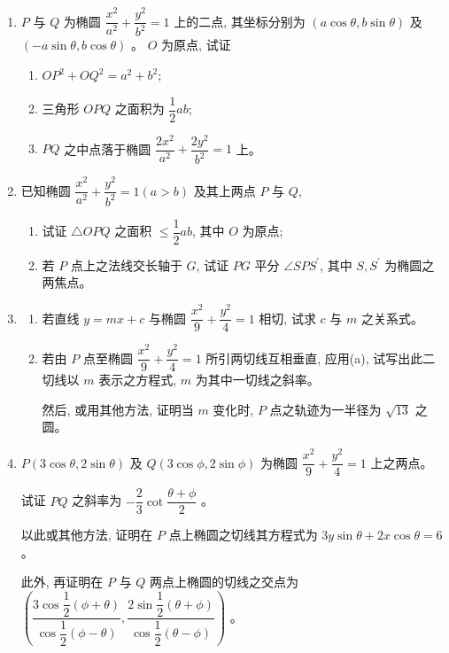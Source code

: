 \documentclass[10pt]{article}
\begin{document}
\begin{enumerate}
  \item $P$ 与 $Q$ 为椭圆 $\dfrac{x^{2}}{a^{2}}+\dfrac{y^{2}}{b^{2}}=1$ 上的二点, 其坐标分别为 $(a \cos \theta, b \sin \theta)$ 及 $(-a \sin \theta, b \cos \theta)$ 。 $O$ 为原点, 试证

  \begin{enumerate}
    \item $OP^{2}+OQ^{2}=a^{2}+b^{2}$;
    \item 三角形 $OPQ$ 之面积为 $\dfrac{1}{2} a b$;
    \item $PQ$ 之中点落于椭圆 $\dfrac{2 x^{2}}{a^{2}}+\dfrac{2 y^{2}}{b^{2}}=1$ 上。
  \end{enumerate}

  \item 已知椭圆 $\dfrac{x^{2}}{a^{2}}+\dfrac{y^{2}}{b^{2}}=1(a>b)$ 及其上两点 $P$ 与 $Q$,

  \begin{enumerate}
    \item 试证 $\triangle OPQ$ 之面积 $\leq \dfrac{1}{2} a b$, 其中 $O$ 为原点;
    \item 若 $P$ 点上之法线交长轴于 $G$, 试证 $PG$ 平分 $\angle SPS^{\prime}$, 其中 $S, S^{\prime}$ 为椭圆之两焦点。
  \end{enumerate}

  \item \begin{enumerate}
    \item 若直线 $y=m x+c$ 与椭圆 $\dfrac{x^{2}}{9}+\dfrac{y^{2}}{4}=1$ 相切, 试求 $c$ 与 $m$ 之关系式。
    \item 若由 $P$ 点至椭圆 $\dfrac{x^{2}}{9}+\dfrac{y^{2}}{4}=1$ 所引两切线互相垂直, 应用(a), 试写出此二切线以 $m$ 表示之方程式, $m$ 为其中一切线之斜率。
  
    然后, 或用其他方法, 证明当 $m$ 变化时, $P$ 点之轨迹为一半径为 $\sqrt{13}$ 之圆。
  \end{enumerate}

  \item $P(3 \cos \theta, 2 \sin \theta)$ 及 $Q(3 \cos \phi, 2 \sin \phi)$ 为椭圆 $\dfrac{x^{2}}{9}+\dfrac{y^{2}}{4}=1$ 上之两点。

  试证 $PQ$ 之斜率为 $-\dfrac{2}{3} \cot \dfrac{\theta+\phi}{2}$ 。

  以此或其他方法, 证明在 $P$ 点上椭圆之切线其方程式为 $3 y \sin \theta+2 x \cos \theta=6$ 。

  此外, 再证明在 $P$ 与 $Q$ 两点上椭圆的切线之交点为 $\left(\dfrac{3 \cos \dfrac{1}{2}(\phi+\theta)}{\cos \dfrac{1}{2}(\phi-\theta)}, \dfrac{2 \sin \dfrac{1}{2}(\theta+\phi)}{\cos \dfrac{1}{2}(\theta-\phi)}\right)$ 。


\end{enumerate}
\end{document}
